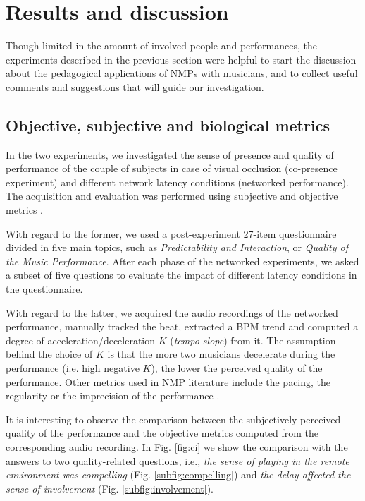 \section{Results and discussion}\label{sec:discussion}
Though limited in the amount of involved people and performances, the experiments described in the previous section were helpful to start the discussion about the pedagogical applications of NMPs with musicians, and to collect useful comments and suggestions that will guide our investigation. 


\subsection{Objective, subjective and biological metrics}\label{subsec:metrics}
In the two experiments, we investigated the sense of presence and quality of performance of the couple of subjects in case of visual occlusion (co-presence experiment) and different network latency conditions (networked performance). The acquisition and evaluation was performed using subjective and objective metrics \cite{CIM2018}. 

With regard to the former, we used a post-experiment 27-item questionnaire divided in five main topics, such as \textit{Predictability and Interaction}, or \textit{Quality of the Music Performance}. After each phase of the networked experiments, we asked a subset of five questions to evaluate the impact of different latency conditions in the questionnaire.

With regard to the latter, we acquired the audio recordings of the networked performance, manually tracked the beat, extracted a BPM trend and computed a degree of acceleration/deceleration $K$  (\textit{tempo slope}) from it. The assumption behind the choice of $K$ is that the more two musicians decelerate during the performance (i.e. high negative $K$), the lower the perceived quality of the performance. Other metrics used in NMP literature include the pacing, the regularity or the imprecision of the performance \cite{RottondiOverview}.

It is interesting to observe the comparison between the subjectively-perceived quality of the performance and the objective metrics computed from the corresponding audio recording. In Fig. \ref{fig:ci} we show the comparison with the answers to two quality-related questions, i.e., \textit{the sense of playing in the remote environment was compelling} (Fig. \ref{subfig:compelling}) and \textit{the delay affected the sense of involvement} (Fig. \ref{subfig:involvement}).

